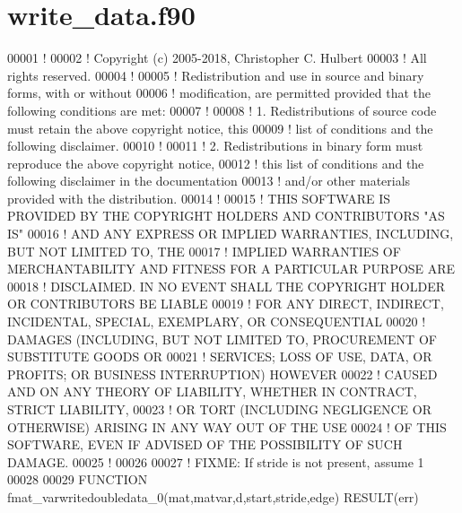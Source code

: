 \hypertarget{write__data_8f90_source}{}\section{write\+\_\+data.\+f90}
\label{write__data_8f90_source}

\begin{DoxyCode}
00001 \textcolor{comment}{!}
00002 \textcolor{comment}{! Copyright (c) 2005-2018, Christopher C. Hulbert}
00003 \textcolor{comment}{! All rights reserved.}
00004 \textcolor{comment}{!}
00005 \textcolor{comment}{! Redistribution and use in source and binary forms, with or without}
00006 \textcolor{comment}{! modification, are permitted provided that the following conditions are met:}
00007 \textcolor{comment}{!}
00008 \textcolor{comment}{! 1. Redistributions of source code must retain the above copyright notice, this}
00009 \textcolor{comment}{!    list of conditions and the following disclaimer.}
00010 \textcolor{comment}{!}
00011 \textcolor{comment}{! 2. Redistributions in binary form must reproduce the above copyright notice,}
00012 \textcolor{comment}{!    this list of conditions and the following disclaimer in the documentation}
00013 \textcolor{comment}{!    and/or other materials provided with the distribution.}
00014 \textcolor{comment}{!}
00015 \textcolor{comment}{! THIS SOFTWARE IS PROVIDED BY THE COPYRIGHT HOLDERS AND CONTRIBUTORS "AS IS"}
00016 \textcolor{comment}{! AND ANY EXPRESS OR IMPLIED WARRANTIES, INCLUDING, BUT NOT LIMITED TO, THE}
00017 \textcolor{comment}{! IMPLIED WARRANTIES OF MERCHANTABILITY AND FITNESS FOR A PARTICULAR PURPOSE ARE}
00018 \textcolor{comment}{! DISCLAIMED. IN NO EVENT SHALL THE COPYRIGHT HOLDER OR CONTRIBUTORS BE LIABLE}
00019 \textcolor{comment}{! FOR ANY DIRECT, INDIRECT, INCIDENTAL, SPECIAL, EXEMPLARY, OR CONSEQUENTIAL}
00020 \textcolor{comment}{! DAMAGES (INCLUDING, BUT NOT LIMITED TO, PROCUREMENT OF SUBSTITUTE GOODS OR}
00021 \textcolor{comment}{! SERVICES; LOSS OF USE, DATA, OR PROFITS; OR BUSINESS INTERRUPTION) HOWEVER}
00022 \textcolor{comment}{! CAUSED AND ON ANY THEORY OF LIABILITY, WHETHER IN CONTRACT, STRICT LIABILITY,}
00023 \textcolor{comment}{! OR TORT (INCLUDING NEGLIGENCE OR OTHERWISE) ARISING IN ANY WAY OUT OF THE USE}
00024 \textcolor{comment}{! OF THIS SOFTWARE, EVEN IF ADVISED OF THE POSSIBILITY OF SUCH DAMAGE.}
00025 \textcolor{comment}{!}
00026 
00027 \textcolor{comment}{! FIXME: If stride is not present, assume 1}
00028 
00029 \textcolor{keyword}{FUNCTION }fmat\_varwritedoubledata\_0(mat,matvar,d,start,stride,edge) \textcolor{keyword}{RESULT}(err)

\end{DoxyCode}
